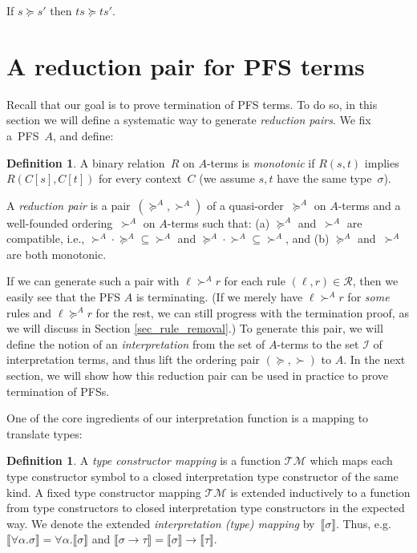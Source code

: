 \documentclass[a4paper,UKenglish,cleveref,autoref,numberwithinsect]{lipics-v2019}
\theoremstyle{definition}
\newtheorem{defn}[theorem]{Definition}
\newcommand{\Rules}{\mathcal{R}}
\newcommand{\Iterms}{\mathcal{I}}
\newcommand{\arrtype}{\rightarrow}
\newcommand{\quant}[2]{\forall #1.#2}
\newcommand{\typeinterpret}[1]{\llbracket #1 \rrbracket}
\newcommand{\Typemap}{\mathcal{T\!M}}
\begin{document}
\begin{corollary}\label{cor_app_wm}
  If $s \succeq s'$ then $t s \succeq t s'$.
\end{corollary}

\section{A reduction pair for PFS terms}\label{sec_reduction_pairs}

Recall that our goal is to prove termination of PFS terms.  To
do so, in this section we will define a systematic way to generate
\emph{reduction pairs}. We fix a~PFS~$A$, and define:

\begin{defn}
  A binary relation~$R$ on $A$-terms is \emph{monotonic} if $R(s, t)$
  implies $R(C[s], C[t])$ for every context~$C$ (we assume $s,t$ have
  the same type~$\sigma$).

  A \emph{reduction pair} is a pair~$(\succeq^A,\succ^A)$ of a
  quasi-order~$\succeq^A$ on $A$-terms and a well-founded
  ordering~$\succ^A$ on $A$-terms such that:
  (a)
  $\succeq^A$ and~$\succ^A$ are compatible, i.e., ${\succ^A}
    \cdot {\succeq^A} \subseteq {\succ^A}$ and ${\succeq^A} \cdot
          {\succ^A} \subseteq {\succ^A}$,
  and (b)
  $\succeq^A$ and~$\succ^A$ are both monotonic.
\end{defn}


If we can generate such a pair with $\ell \succ^A r$ for each
rule $(\ell,r) \in \Rules$, then we easily see that the PFS $A$ is
terminating.  (If we merely have $\ell \succ^A r$ for \emph{some}
rules and $\ell \succeq^A r$ for the rest, we can still progress
with the termination proof, as we will discuss in Section
\ref{sec_rule_removal}.)
To generate this pair, we will define the notion of an
\emph{interpretation} from the set of $A$-terms to the set $\Iterms$ of
interpretation terms, and thus lift the ordering pair $(\succeq,\succ)$
to $A$.
In the next section, we will show how this reduction pair can be used
in practice to prove termination of PFSs.

One of the core ingredients of our interpretation function is a
mapping to translate types:

\begin{defn}
  A \emph{type constructor mapping} is a function $\Typemap$ which
  maps each type constructor symbol to a closed interpretation type
  constructor of the same kind. A fixed type constructor mapping
  $\Typemap$ is extended inductively to a function from type
  constructors to closed interpretation type constructors in the
  expected way. We denote the extended \emph{interpretation (type)
    mapping} by~$\typeinterpret{\sigma}$. Thus,
  e.g.~$\typeinterpret{\quant{\alpha}{\sigma}} =
  \quant{\alpha}{\typeinterpret{\sigma}}$ and $\typeinterpret{\sigma
    \arrtype \tau} = \typeinterpret{\sigma} \arrtype
  \typeinterpret{\tau}$.
\end{defn}
\end{document}
